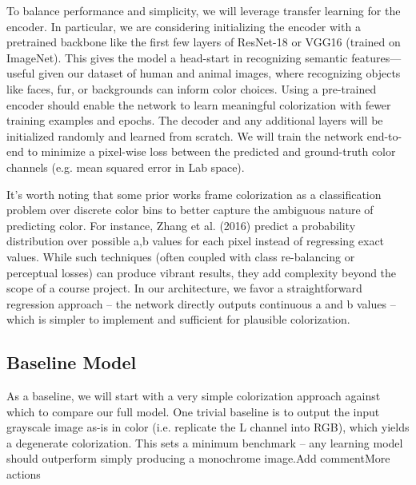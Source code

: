 \documentclass{article} %
\begin{document}
To balance performance and simplicity, we will leverage transfer learning for the encoder. In particular, we are considering initializing the encoder with a pretrained backbone like the first few layers of ResNet-18 or VGG16 (trained on ImageNet). This gives the model a head-start in recognizing semantic features—useful given our dataset of human and animal images, where recognizing objects like faces, fur, or backgrounds can inform color choices. \cite{olah2022lettherebecolor} Using a pre-trained encoder should enable the network to learn meaningful colorization with fewer training examples and epochs. \cite{olah2022lettherebecolor} The decoder and any additional layers will be initialized randomly and learned from scratch. We will train the network end-to-end to minimize a pixel-wise loss between the predicted and ground-truth color channels (e.g. mean squared error in Lab space).

It’s worth noting that some prior works frame colorization as a classification problem over discrete color bins to better capture the ambiguous nature of predicting color. For instance, Zhang et al. (2016) predict a probability distribution over possible a,b values for each pixel instead of regressing exact values. \cite{olah2022lettherebecolor} While such techniques (often coupled with class re-balancing or perceptual losses) can produce vibrant results, they add complexity beyond the scope of a course project. In our architecture, we favor a straightforward regression approach – the network directly outputs continuous a and b values – which is simpler to implement and sufficient for plausible colorization.

\subsection{Baseline Model}

As a baseline, we will start with a very simple colorization approach against which to compare our full model. One trivial baseline is to output the input grayscale image as-is in color (i.e. replicate the L channel into RGB), which yields a degenerate colorization. This sets a minimum benchmark – any learning model should outperform simply producing a monochrome image.Add commentMore actions
\end{document}
